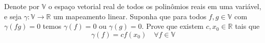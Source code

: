Denote por \(\mathbb{V}\) o espaço vetorial real de todos os polinômios reais em uma variável, e seja \(\gamma \colon \mathbb{V}\to \mathbb{R}\) um mapeamento linear. Suponha que para todos \(f,g\in \mathbb{V}\) com \(\gamma(fg)=0\) temos \(\gamma(f)=0\) ou \(\gamma(g)=0\). Prove que existem \(c,x_0\in \mathbb{R}\) tais que
\[ \gamma(f)=cf(x_0)\quad \forall f\in \mathbb{V} \]
